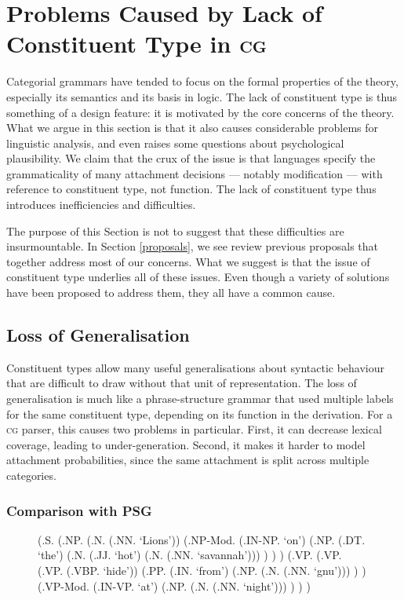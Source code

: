 \documentclass[11pt,twoside,final]{ahudson-harvard}
\newcommand{\cg}{\textsc{cg}\xspace}
\newcommand{\psg}{\textsc{PSG}\xspace}
\begin{document}
\section{Problems Caused by Lack of Constituent Type in \cg}

Categorial grammars have tended to focus on the formal properties of the theory, especially its semantics and its basis in logic. The lack of constituent type is thus something of a design feature: it is motivated by the core concerns of the theory. What we argue in this section is that it also causes considerable problems for linguistic analysis, and even raises some questions about psychological plausibility. We claim that the crux of the issue is that languages specify the grammaticality of many attachment decisions --- notably modification --- with reference to constituent type, not function. The lack of constituent type thus introduces inefficiencies and difficulties.

The purpose of this Section is not to suggest that these difficulties are insurmountable. In Section \ref{proposals}, we see review previous proposals that together address most of our concerns. What we suggest is that the issue of constituent type underlies all of these issues. Even though a variety of solutions have been proposed to address them, they all have a common cause.

\subsection{Loss of Generalisation}

Constituent types allow many useful generalisations about syntactic behaviour that are difficult to draw without that unit of representation. The loss of generalisation is much like a phrase-structure grammar that used multiple labels for the same constituent type, depending on its function in the derivation. For a \cg parser, this causes two problems in particular. First, it can decrease lexical coverage, leading to under-generation. Second, it makes it harder to model attachment probabilities, since the same attachment is split across multiple categories.

\subsubsection{Comparison with \psg}

 \begin{figure}
\centering
 \begin{parsetree}

(.S.
  (.NP.
    (.N. (.NN. `Lions'))
    (.NP-Mod.
      (.IN-NP. `on')
      (.NP.
        (.DT. `the')
        (.N. (.JJ. `hot') (.N. (.NN. `savannah')))
      )
    )
  )
  (.VP.
    (.VP.
      (.VP. (.VBP. `hide'))
      (.PP.
        (.IN. `from')
        (.NP. (.N. (.NN. `gnu')))
      )
    )
    (.VP-Mod.
      (.IN-VP. `at')
      (.NP. (.N. (.NN. `night')))
    )
  )
)
 \end{parsetree}
 \end{figure}
\end{document}
